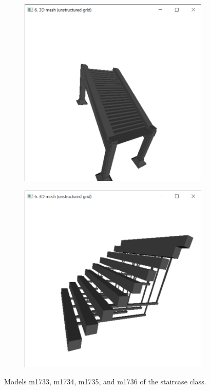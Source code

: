 \documentclass{bigdata}
\begin{document}
\begin{figure}[h!]
\begin{subfigure}[b]{0.2\linewidth}
	\end{subfigure}
	\begin{subfigure}[b]{0.2\linewidth}
		\includegraphics[width=\linewidth]{Pictures/Evaluation/staircaseClass/stair3.png}
	\end{subfigure}
	\begin{subfigure}[b]{0.2\linewidth}
		\includegraphics[width=\linewidth]{Pictures/Evaluation/staircaseClass/stair4.png}
	\end{subfigure}
	\caption{Models m1733, m1734, m1735, and m1736 of the staircase class.}
	\label{fig:staircases}
\end{figure}
\end{document}
